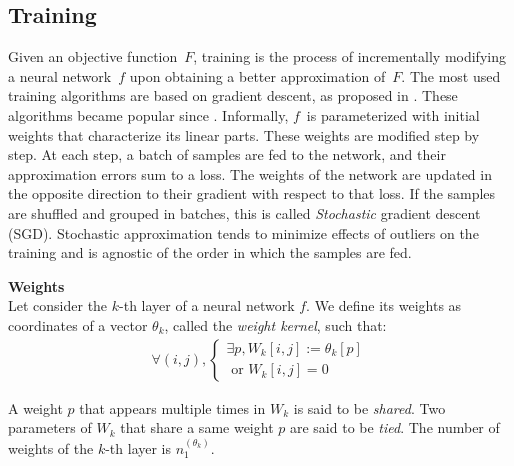 

\subsection{Training}
\label{sec:training}

Given an objective function~$F$, training is the process of incrementally modifying a neural network~$f$ upon obtaining a better approximation of~$F$.
The most used training algorithms are based on gradient descent, as proposed in \citep{widrow1960adaptive}. These algorithms became popular since \citep{rumelhart1985learning}. Informally, $f$~is parameterized with initial weights that characterize its linear parts. These weights are modified step by step. At each step, a batch of samples are fed to the network, and their approximation errors sum to a loss. The weights of the network are updated in the opposite direction to their gradient with respect to that loss. If the samples are shuffled and grouped in batches, this is called \emph{Stochastic} gradient descent (SGD). Stochastic approximation \citep{robbins1985stochastic} tends to minimize effects of outliers on the training and is agnostic of the order in which the samples are fed.


\begin{definition}\textbf{Weights}\\
Let consider the $k$-th layer of a neural network $f$. We define its weights as coordinates of a vector $\theta_k$, called the \emph{weight kernel}, such that:
\begin{gather*}
  \forall (i,j),
    \begin{cases}
      \exists p, W_k[i,j] := \theta_k[p] \\
      \text{ or } W_k[i,j] = 0
    \end{cases}
\end{gather*}
\end{definition}
A weight $p$ that appears multiple times in $W_k$ is said to be \emph{shared}. Two parameters of $W_k$ that share a same weight $p$ are said to be \emph{tied}. The number of weights of the $k$-th layer is $n_1^{(\theta_k)}$.

